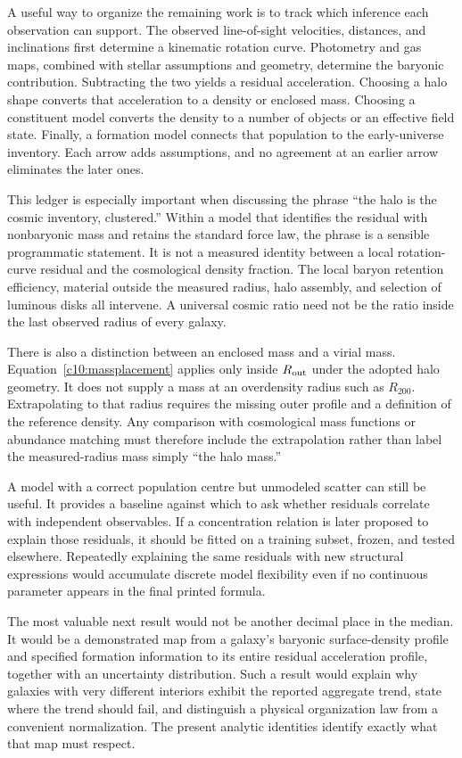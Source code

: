 A useful way to organize the remaining work is to track which inference each observation can support. The observed line-of-sight velocities, distances, and inclinations first determine a kinematic rotation curve. Photometry and gas maps, combined with stellar assumptions and geometry, determine the baryonic contribution. Subtracting the two yields a residual acceleration. Choosing a halo shape converts that acceleration to a density or enclosed mass. Choosing a constituent model converts the density to a number of objects or an effective field state. Finally, a formation model connects that population to the early-universe inventory. Each arrow adds assumptions, and no agreement at an earlier arrow eliminates the later ones.

This ledger is especially important when discussing the phrase ``the halo is the cosmic inventory, clustered.'' Within a model that identifies the residual with nonbaryonic mass and retains the standard force law, the phrase is a sensible programmatic statement. It is not a measured identity between a local rotation-curve residual and the cosmological density fraction. The local baryon retention efficiency, material outside the measured radius, halo assembly, and selection of luminous disks all intervene. A universal cosmic ratio need not be the ratio inside the last observed radius of every galaxy.

There is also a distinction between an enclosed mass and a virial mass. Equation~\eqref{c10:massplacement} applies only inside $R_{\rm out}$ under the adopted halo geometry. It does not supply a mass at an overdensity radius such as $R_{200}$. Extrapolating to that radius requires the missing outer profile and a definition of the reference density. Any comparison with cosmological mass functions or abundance matching must therefore include the extrapolation rather than label the measured-radius mass simply ``the halo mass.''

A model with a correct population centre but unmodeled scatter can still be useful. It provides a baseline against which to ask whether residuals correlate with independent observables. If a concentration relation is later proposed to explain those residuals, it should be fitted on a training subset, frozen, and tested elsewhere. Repeatedly explaining the same residuals with new structural expressions would accumulate discrete model flexibility even if no continuous parameter appears in the final printed formula.

The most valuable next result would not be another decimal place in the median. It would be a demonstrated map from a galaxy's baryonic surface-density profile and specified formation information to its entire residual acceleration profile, together with an uncertainty distribution. Such a result would explain why galaxies with very different interiors exhibit the reported aggregate trend, state where the trend should fail, and distinguish a physical organization law from a convenient normalization. The present analytic identities identify exactly what that map must respect.

